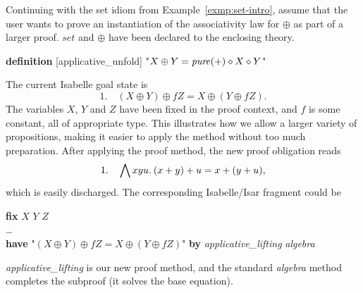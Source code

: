 \begin{example}\label{exmp:set-usage}
Continuing with the set idiom from Example~\ref{exmp:set-intro}, assume that
the user wants to prove an instantiation of the associativity law for $\oplus$
as part of a larger proof.
$\mathit{set}$ and $\oplus$ have been declared to the enclosing theory.
\begin{isabelle}
	\textbf{definition} [applicative\_unfold] "$X \oplus Y = \operatorname{\mathit{pure}} (+) \diamond X \diamond Y$"
\end{isabelle}
The current Isabelle goal state is
\[ 1. \quad (X \oplus Y) \oplus f Z = X \oplus (Y \oplus f Z). \]
The variables $X$, $Y$ and $Z$ have been fixed in the proof context, and $f$ is
some constant, all of appropriate type.
This illustrates how we allow a larger variety of propositions, making it
easier to apply the method without too much preparation.
After applying the proof method, the new proof obligation reads
\[ 1. \quad \bigwedge x y u.\>(x + y) + u = x + (y + u), \]
which is easily discharged.
The corresponding Isabelle/Isar fragment could be
\begin{isabelle}
	\textbf{fix} $X$ $Y$ $Z$ \\
	\dots \\
	\textbf{have} "$(X \oplus Y) \oplus f Z = X \oplus (Y \oplus f Z)$"
		\textbf{by} \textit{applicative\_lifting} \textit{algebra}
\end{isabelle}
\textit{applicative\_lifting} is our new proof method, and the standard
\textit{algebra} method completes the subproof (it solves the base equation).
\end{example}

